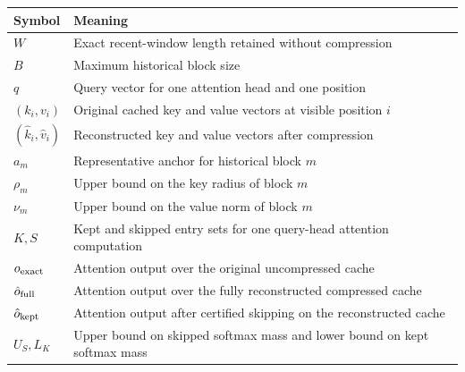 \begin{threeparttable}
\begin{tabularx}{\linewidth}{@{}lX@{}}
\toprule
Symbol & Meaning \\
\midrule
\(W\) & Exact recent-window length retained without compression \\
\(B\) & Maximum historical block size \\
\(q\) & Query vector for one attention head and one position \\
\((k_i,v_i)\) & Original cached key and value vectors at visible position \(i\) \\
\((\hat{k}_i,\hat{v}_i)\) & Reconstructed key and value vectors after compression \\
\(a_m\) & Representative anchor for historical block \(m\) \\
\(\rho_m\) & Upper bound on the key radius of block \(m\) \\
\(\nu_m\) & Upper bound on the value norm of block \(m\) \\
\(K,S\) & Kept and skipped entry sets for one query-head attention computation \\
\(o_{\mathrm{exact}}\) & Attention output over the original uncompressed cache \\
\(\hat{o}_{\mathrm{full}}\) & Attention output over the fully reconstructed compressed cache \\
\(\hat{o}_{\mathrm{kept}}\) & Attention output after certified skipping on the reconstructed cache \\
\(U_S,L_K\) & Upper bound on skipped softmax mass and lower bound on kept softmax mass \\
\bottomrule
\end{tabularx}
\end{threeparttable}
